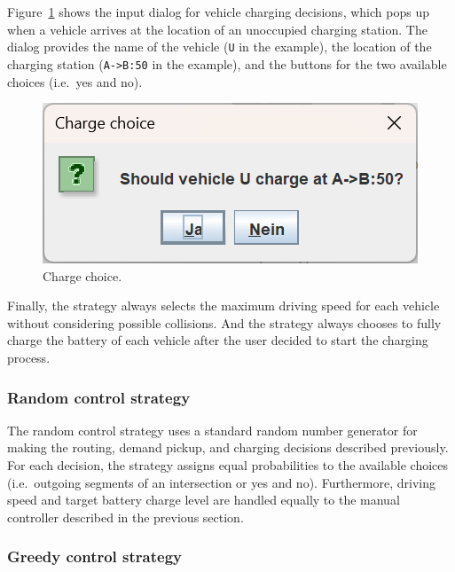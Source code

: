 \documentclass[a4paper,twoside]{article}
\begin{document}
	Figure~\ref{fig:manual-controller-charge} shows the input dialog for vehicle charging decisions, which pops up when a vehicle arrives at the location of an unoccupied charging station.
	The dialog provides the name of the vehicle (\texttt{U} in the example), the location of the charging station (\texttt{A->B:50} in the example), and the buttons for the two available choices (i.e.\ yes and no).
	
	\begin{figure}[!ht]
		\centering
		\includegraphics[scale=0.4]{../../screenshots/manual-controller-charge.png}
		\caption{Charge choice.}
		\label{fig:manual-controller-charge}
	\end{figure}
	
	Finally, the strategy always selects the maximum driving speed for each vehicle without considering possible collisions.
	And the strategy always chooses to fully charge the battery of each vehicle after the user decided to start the charging process.
	
	\subsubsection*{Random control strategy}
	\label{sec:controller-random}
	
	The random control strategy uses a standard random number generator for making the routing, demand pickup, and charging decisions described previously.
	For each decision, the strategy assigns equal probabilities to the available choices (i.e.\ outgoing segments of an intersection or yes and no).
	Furthermore, driving speed and target battery charge level are handled equally to the manual controller described in the previous section.
	
	\subsubsection*{Greedy control strategy}
	\label{sec:controller-greedy}
	
\end{document}
